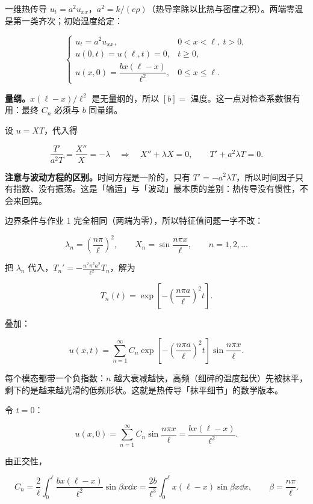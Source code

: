 \documentclass[11pt]{ctexart}
\begin{document}
一维热传导 $u_t=a^2u_{xx}$，$a^2=k/(c\rho)$（热导率除以比热与密度之积）。两端零温是第一类齐次；初始温度给定：

\[
\begin{cases}
u_t=a^2u_{xx}, & 0<x<\ell,\ t>0,\\[2pt]
u(0,t)=u(\ell,t)=0, & t\ge0,\\[2pt]
u(x,0)=\dfrac{bx(\ell-x)}{\ell^2}, & 0\le x\le\ell .
\end{cases}
\]

\textbf{量纲。}$x(\ell-x)/\ell^2$ 是无量纲的，所以 $[b]=$ 温度。这一点对检查系数很有用：最终 $C_n$ 必须与 $b$ 同量纲。


设 $u=XT$，代入得

\[
\frac{T'}{a^2T}=\frac{X''}{X}=-\lambda
\quad\Longrightarrow\quad
X''+\lambda X=0,\qquad T'+a^2\lambda T=0 .
\]

\textbf{注意与波动方程的区别。}时间方程是一阶的，只有 $T'=-a^2\lambda T$，所以时间因子只有指数、没有振荡。这是「输运」与「波动」最本质的差别：热传导没有惯性，不会来回晃。

边界条件与作业 1 完全相同（两端为零），所以特征值问题一字不改：

\[
\lambda_n=\left(\frac{n\pi}{\ell}\right)^2,
\qquad
X_n=\sin\frac{n\pi x}{\ell},
\qquad n=1,2,\dots
\]


把 $\lambda_n$ 代入，$T_n'=-\frac{n^2\pi^2a^2}{\ell^2}T_n$，解为

\[
T_n(t)=\exp\left[-\left(\frac{n\pi a}{\ell}\right)^2t\right].
\]

叠加：

\[
u(x,t)=\sum_{n=1}^{\infty}C_n\exp\left[-\left(\frac{n\pi a}{\ell}\right)^2t\right]\sin\frac{n\pi x}{\ell}.
\]

每个模态都带一个负指数：$n$ 越大衰减越快，高频（细碎的温度起伏）先被抹平，剩下的是越来越光滑的低频形状。这就是热传导「抹平细节」的数学版本。


令 $t=0$：

\[
u(x,0)=\sum_{n=1}^{\infty}C_n\sin\frac{n\pi x}{\ell}=\frac{bx(\ell-x)}{\ell^2}.
\]

由正交性，

\[
C_n=\frac{2}{\ell}\int_0^{\ell}\frac{bx(\ell-x)}{\ell^2}\sin\beta x\dd x
=\frac{2b}{\ell^3}\int_0^{\ell}x(\ell-x)\sin\beta x\dd x,
\qquad \beta=\frac{n\pi}{\ell}.
\]
\end{document}
